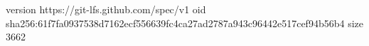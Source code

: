 version https://git-lfs.github.com/spec/v1
oid sha256:61f7fa0937538d7162ecf556639fc4ca27ad2787a943c96442e517cef94b56b4
size 3662
